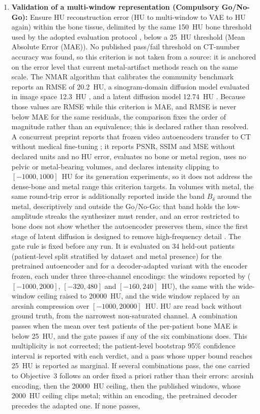 \documentclass[9pt]{extarticle}
\begin{document}
\begin{enumerate}
  \item \textbf{Validation of a multi-window representation (Compulsory Go/No-Go):} Ensure HU reconstruction error (HU to multi-window to VAE to HU again) within the bone tissue, delimited by the same 150~HU bone threshold used by the adopted evaluation protocol \citep{peters2025hybrid,haneda2025aapm}, below a 25~HU threshold (Mean Absolute Error (MAE)). No published pass/fail threshold on CT-number accuracy was found, so this criterion is not taken from a source: it is anchored on the error level that current metal-artifact methods reach on the same scale. The NMAR algorithm that calibrates the community benchmark reports an RMSE of 20.2~HU, a sinogram-domain diffusion model evaluated in image space 12.3~HU \citep{karageorgos2024ddpm}, and a latent diffusion model 12.74~HU \citep{yun2026simulationdriven}. Because those values are RMSE while this criterion is MAE, and RMSE is never below MAE for the same residuals, the comparison fixes the order of magnitude rather than an equivalence; this is declared rather than resolved. A concurrent preprint reports that frozen video autoencoders transfer to CT without medical fine-tuning \citep{chen2026foundationvae}; it reports PSNR, SSIM and MSE without declared units and no HU error, evaluates no bone or metal region, uses no pelvic or metal-bearing volumes, and declares intensity clipping to $[-1000, 1000]$~HU for its generation experiments, so it does not address the dense-bone and metal range this criterion targets. In volumes with metal, the same round-trip error is additionally reported inside the band $B_{\delta}$ around the metal, descriptively and outside the Go/No-Go: that band holds the low-amplitude streaks the synthesizer must render, and an error restricted to bone does not show whether the autoencoder preserves them, since the first stage of latent diffusion is designed to remove high-frequency detail \citep{rombach2022latentdiffusion}. The gate rule is fixed before any run. It is evaluated on 34 held-out patients (patient-level split stratified by dataset and metal presence) for the pretrained autoencoder and for a decoder-adapted variant with the encoder frozen, each under three three-channel encodings: the windows reported by \citet{wang2025adaptiveweighting} ($[-1000, 2000]$, $[-320, 480]$ and $[-160, 240]$~HU), the same with the wide-window ceiling raised to 20000~HU, and the wide window replaced by an arcsinh compression over $[-1000, 20000]$~HU. HU are read back without ground truth, from the narrowest non-saturated channel. A combination passes when the mean over test patients of the per-patient bone MAE is below 25~HU, and the gate passes if any of the six combinations does. This multiplicity is not corrected; the patient-level bootstrap 95\% confidence interval is reported with each verdict, and a pass whose upper bound reaches 25~HU is reported as marginal. If several combinations pass, the one carried to Objective~3 follows an order fixed a priori rather than their errors: arcsinh encoding, then the 20000~HU ceiling, then the published windows, whose 2000~HU ceiling clips metal; within an encoding, the pretrained decoder precedes the adapted one. If none passes, 
\end{enumerate}
\end{document}
